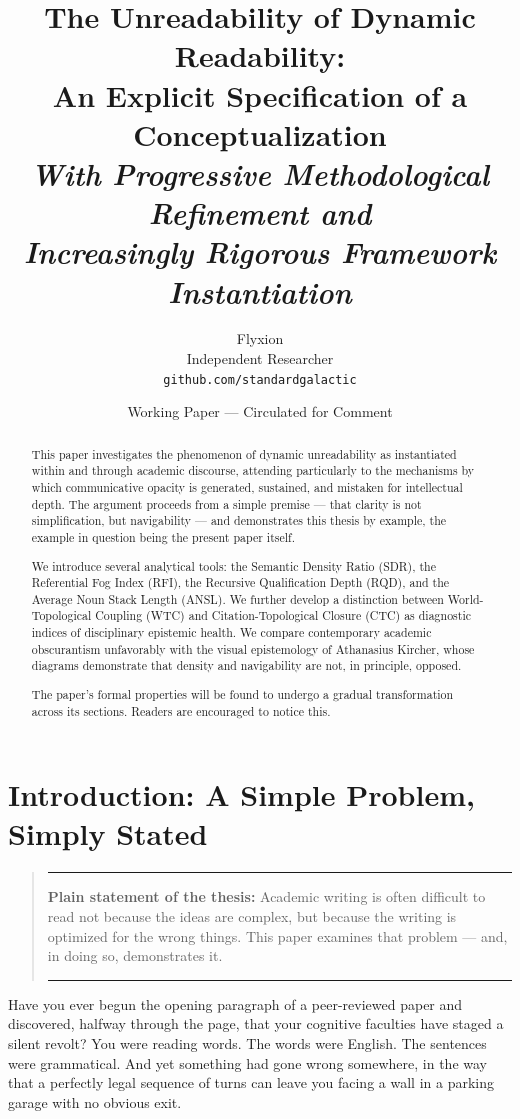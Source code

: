 \documentclass[12pt, a4paper]{article}
\title{%
  \textbf{The Unreadability of Dynamic Readability:}\\
  \large An Explicit Specification of a Conceptualization\\[0.5em]
  \normalsize\textit{With Progressive Methodological Refinement and\\
  Increasingly Rigorous Framework Instantiation}
}
\author{%
  Flyxion\\
  \small Independent Researcher\\
  \small \texttt{github.com/standardgalactic}
}
\date{\small Working Paper --- Circulated for Comment}
\newenvironment{claritybox}
  {\begin{quote}\small\color{fogblue}\rule{\linewidth}{0.6pt}\par\smallskip}
  {\par\smallskip\rule{\linewidth}{0.4pt}\end{quote}}
\begin{document}
\maketitle
\thispagestyle{empty}

\begin{abstract}
This paper investigates the phenomenon of dynamic unreadability as instantiated within and through academic discourse, attending particularly to the mechanisms by which communicative opacity is generated, sustained, and mistaken for intellectual depth. The argument proceeds from a simple premise --- that clarity is not simplification, but navigability --- and demonstrates this thesis by example, the example in question being the present paper itself.

We introduce several analytical tools: the Semantic Density Ratio (SDR), the Referential Fog Index (RFI), the Recursive Qualification Depth (RQD), and the Average Noun Stack Length (ANSL). We further develop a distinction between World-Topological Coupling (WTC) and Citation-Topological Closure (CTC) as diagnostic indices of disciplinary epistemic health. We compare contemporary academic obscurantism unfavorably with the visual epistemology of Athanasius Kircher, whose diagrams demonstrate that density and navigability are not, in principle, opposed.

The paper's formal properties will be found to undergo a gradual transformation across its sections. Readers are encouraged to notice this.
\end{abstract}

\newpage
\tableofcontents
\newpage

\section{Introduction: A Simple Problem, Simply Stated}

\begin{claritybox}
\textbf{Plain statement of the thesis:} Academic writing is often difficult to read not because the ideas are complex, but because the writing is optimized for the wrong things. This paper examines that problem --- and, in doing so, demonstrates it.
\end{claritybox}

Have you ever begun the opening paragraph of a peer-reviewed paper and discovered, halfway through the page, that your cognitive faculties have staged a silent revolt? You were reading words. The words were English. The sentences were grammatical. And yet something had gone wrong somewhere, in the way that a perfectly legal sequence of turns can leave you facing a wall in a parking garage with no obvious exit.
\end{document}
